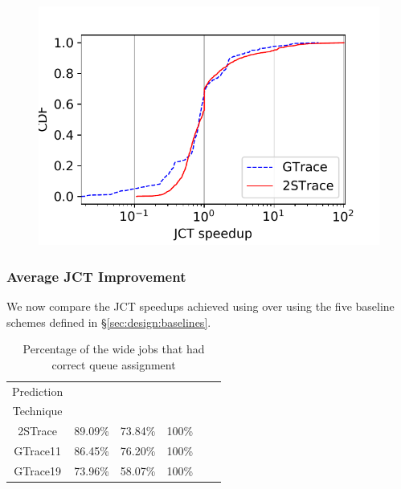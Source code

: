 \begin{figure}
\includegraphics[width=0.9\linewidth]{figures/testbed/testbedBothTracesSpeedupCDF-speedUp-CDF.pdf}
\label{fig:testbed:speedup:cdf}
\end{figure}

\subsubsection{Average JCT Improvement}
\label{sec:sim:averageJCT}

We now compare the JCT speedups achieved using \slearn over using the
five baseline schemes defined in \S\ref{sec:design:baselines}.

\begin{table}[tp]
  \caption{Percentage of the wide jobs that had correct queue assignment  
    }
\vspace{-0.1in}
\label{table:sim:correctQueue}
  \centering
      {\small
	\begin{tabular}{|c|c|c|c|c|c|} 
	  \hline
		Prediction&	\slearn &\primarybasepredict &\oracle\\  
		Technique&&&\\
	  \hline
		2STrace &89.09\%&73.84\%&100\%\\
		GTrace11 &86.45\%&76.20\%&100\%\\
		GTrace19 &73.96\%&58.07\%&100\%\\
	  \hline
	\end{tabular}
      }
\vspace{-0.1in}
\end{table}

